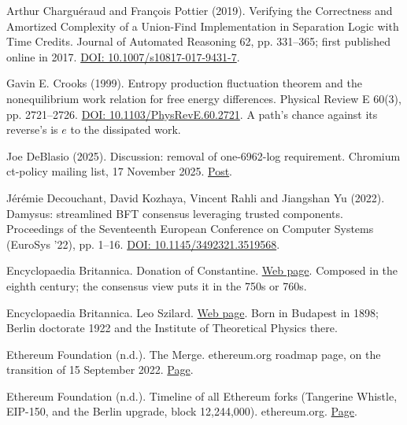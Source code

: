 \documentclass[11pt,twoside]{article}
\theoremstyle{thielethm}
\theoremstyle{thieledef}
\theoremstyle{thieledef}
\theoremstyle{thieledef}
\theoremstyle{thielethm}
\theoremstyle{thieleobs}
\theoremstyle{thielethm}
\begin{document}
\noindent Arthur Charguéraud and François Pottier (2019). Verifying the Correctness and Amortized Complexity of a Union-Find Implementation in Separation Logic with Time Credits. Journal of Automated Reasoning 62, pp. 331--365; first published online in 2017. \href{https://doi.org/10.1007/s10817-017-9431-7}{DOI: 10.1007/s10817-017-9431-7}.
\par\medskip

\noindent Gavin E. Crooks (1999). Entropy production fluctuation theorem and the nonequilibrium work relation for free energy differences. Physical Review E 60(3), pp. 2721--2726. \href{https://doi.org/10.1103/PhysRevE.60.2721}{DOI: 10.1103/PhysRevE.60.2721}. A path's chance against its reverse's is $e$ to the dissipated work.
\par\medskip

\noindent Joe DeBlasio (2025). Discussion: removal of one-6962-log requirement. Chromium ct-policy mailing list, 17 November 2025. \href{https://groups.google.com/a/chromium.org/g/ct-policy/c/amrnTiDFdwM/m/mCyPDc4TAwAJ}{Post}.
\par\medskip

\noindent Jérémie Decouchant, David Kozhaya, Vincent Rahli and Jiangshan Yu (2022). Damysus: streamlined BFT consensus leveraging trusted components. Proceedings of the Seventeenth European Conference on Computer Systems (EuroSys '22), pp. 1--16. \href{https://doi.org/10.1145/3492321.3519568}{DOI: 10.1145/3492321.3519568}.
\par\medskip

\noindent Encyclopaedia Britannica. Donation of Constantine. \href{https://www.britannica.com/topic/Donation-of-Constantine}{Web page}. Composed in the eighth century; the consensus view puts it in the 750s or 760s.
\par\medskip

\noindent Encyclopaedia Britannica. Leo Szilard. \href{https://www.britannica.com/biography/Leo-Szilard}{Web page}. Born in Budapest in 1898; Berlin doctorate 1922 and the Institute of Theoretical Physics there.
\par\medskip

\noindent Ethereum Foundation (n.d.). The Merge. ethereum.org roadmap page, on the transition of 15 September 2022. \href{https://ethereum.org/roadmap/merge/}{Page}.
\par\medskip

\noindent Ethereum Foundation (n.d.). Timeline of all Ethereum forks (Tangerine Whistle, EIP-150, and the Berlin upgrade, block 12,244,000). ethereum.org. \href{https://ethereum.org/ethereum-forks/}{Page}.
\par\medskip
\end{document}
